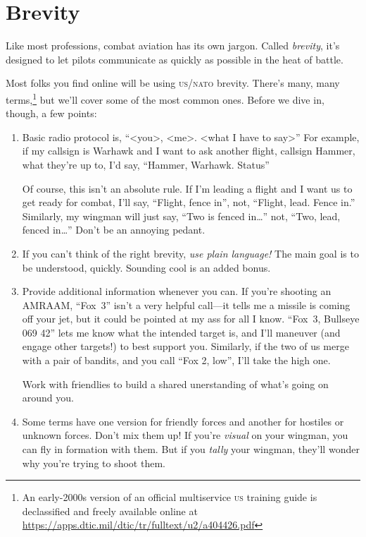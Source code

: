 \chapter{Brevity}
\label{brevity}

Like most professions, combat aviation has its own jargon.
Called \emph{brevity}, it's designed to let pilots communicate
as quickly as possible in the heat of battle.

Most folks you find online will be using \textsc{us/nato} brevity.
There's many,
many terms,\punckern\footnote{An early-2000s version of an official
multiservice \textsc{us} training guide is declassified and freely available
online at \url{https://apps.dtic.mil/dtic/tr/fulltext/u2/a404426.pdf}}
but we'll cover some of the most common ones.
Before we dive in, though, a few points:
\begin{enumerate}
\item Basic radio protocol is, ``<you>, <me>. <what I have to say>''
    For example, if my callsign is Warhawk and I want to ask another flight,
    callsign Hammer, what they're up to, I'd say,
    ``Hammer, Warhawk. Status''

    Of course, this isn't an absolute rule.
    If I'm leading a flight and I want us to get ready for combat, I'll say,
    ``Flight, fence in''\quotekern, not, ``Flight, lead. Fence in.''
    Similarly, my wingman will just say, ``Two is fenced in\dots''
    not, ``Two, lead, fenced in\dots''
    Don't be an annoying pedant.

\item If you can't think of the right brevity,
    \emph{use plain language!}
    The main goal is to be understood, quickly.
    Sounding cool is an added bonus.

\item Provide additional information whenever you can.
    If you're shooting an AMRAAM, ``Fox~3'' isn't a very helpful call---it tells
    me a missile is coming off your jet, but it could be pointed at my ass
    for all I know.
    ``Fox~3, Bullseye 069 42'' lets me know what the intended target is,
    and I'll maneuver (and engage other targets!) to best support you.
    Similarly, if the two of us merge with a pair of bandits,
    and you call ``Fox 2,  low''\quotekern,
    I'll take the high one.

    Work with friendlies to build a shared unerstanding of what's going on
    around you.

\item Some terms have one version for friendly forces
    and another for hostiles or unknown forces.
    Don't mix them up!
    If you're \emph{visual} on your wingman,
    you can fly in formation with them.
    But if you \emph{tally} your wingman,
    they'll wonder why you're trying to shoot them.
\end{enumerate}


